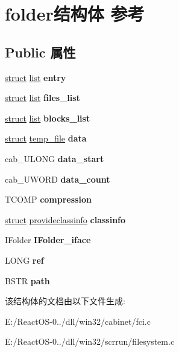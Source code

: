 \hypertarget{structfolder}{}\section{folder结构体 参考}
\label{structfolder}
\subsection*{Public 属性}
\begin{DoxyCompactItemize}
\item 
\mbox{\label{structfolder_aab979be68e8ed70c23e291726b1b4ff3}} 
\hyperlink{interfacestruct}{struct} \hyperlink{classlist}{list} {\bfseries entry}
\item 
\mbox{\label{structfolder_a9b200d25382a2baf2e38b35f5a588010}} 
\hyperlink{interfacestruct}{struct} \hyperlink{classlist}{list} {\bfseries files\+\_\+list}
\item 
\mbox{\label{structfolder_a9d4c92448328ad3efb4cf45ad27416ff}} 
\hyperlink{interfacestruct}{struct} \hyperlink{classlist}{list} {\bfseries blocks\+\_\+list}
\item 
\mbox{\label{structfolder_a70daf5f10e2c7fcc950991f958a19284}} 
\hyperlink{interfacestruct}{struct} \hyperlink{structtemp__file}{temp\+\_\+file} {\bfseries data}
\item 
\mbox{\label{structfolder_aae0f5c674abccdeddebf003dfa652c86}} 
cab\+\_\+\+U\+L\+O\+NG {\bfseries data\+\_\+start}
\item 
\mbox{\label{structfolder_ac8275e69149e338758af1f34f8ddd463}} 
cab\+\_\+\+U\+W\+O\+RD {\bfseries data\+\_\+count}
\item 
\mbox{\label{structfolder_a12d7a6faa5e5c7477176ec807217c1c2}} 
T\+C\+O\+MP {\bfseries compression}
\item 
\mbox{\label{structfolder_a8ecabb385711772c6564c78623d92086}} 
\hyperlink{interfacestruct}{struct} \hyperlink{structprovideclassinfo}{provideclassinfo} {\bfseries classinfo}
\item 
\mbox{\label{structfolder_a853d4ab56fc1c20c62c29545dcfd3602}} 
I\+Folder {\bfseries I\+Folder\+\_\+iface}
\item 
\mbox{\label{structfolder_ade164b0d9d5faa9670f2720f1810b5f7}} 
L\+O\+NG {\bfseries ref}
\item 
\mbox{\label{structfolder_a1a4dbe46342be0f83e46cdce37751bd5}} 
B\+S\+TR {\bfseries path}
\end{DoxyCompactItemize}


该结构体的文档由以下文件生成\+:\begin{DoxyCompactItemize}
\item 
E\+:/\+React\+O\+S-\/0../dll/win32/cabinet/fci.\+c\item 
E\+:/\+React\+O\+S-\/0../dll/win32/scrrun/filesystem.\+c\end{DoxyCompactItemize}
